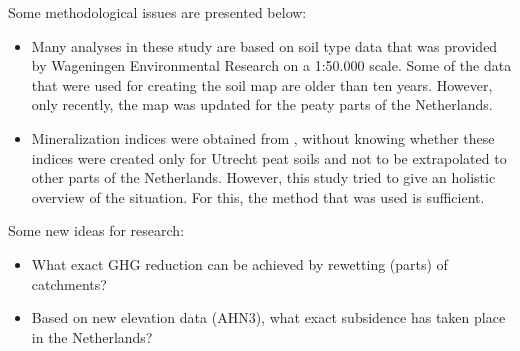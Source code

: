 {Some methodological issues are presented below:
\begin{itemize}
\item Many analyses in these study are based on soil type data that was provided by Wageningen Environmental Research on a 1:50.000 scale. Some of the data that were used for creating the soil map are older than ten years. However, only recently, the map was updated for the peaty parts of the Netherlands. 
\item Mineralization indices were obtained from \citep{stouthamer2008toelichting}, without knowing whether these indices were created only for Utrecht peat soils and not to be extrapolated to other parts of the Netherlands. However, this study tried to give an holistic overview of the situation. For this, the method that was used is sufficient.
\end{itemize} 

Some new ideas for research:
\begin{itemize}
\item What exact GHG reduction can be achieved by rewetting (parts) of catchments?
\item Based on new elevation data (AHN3), what exact subsidence has taken place in the Netherlands?
\end{itemize}





}
